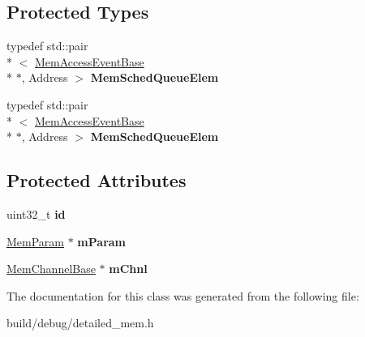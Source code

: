 \subsection*{Protected Types}
\begin{DoxyCompactItemize}
\item 
\hypertarget{classMemSchedulerBase_acafdeb002bbb399b4589ce1b709d9c33}{typedef std\-::pair\\*
$<$ \hyperlink{classMemAccessEventBase}{Mem\-Access\-Event\-Base} \\*
$\ast$, Address $>$ {\bfseries Mem\-Sched\-Queue\-Elem}}\label{classMemSchedulerBase_acafdeb002bbb399b4589ce1b709d9c33}

\item 
\hypertarget{classMemSchedulerBase_acafdeb002bbb399b4589ce1b709d9c33}{typedef std\-::pair\\*
$<$ \hyperlink{classMemAccessEventBase}{Mem\-Access\-Event\-Base} \\*
$\ast$, Address $>$ {\bfseries Mem\-Sched\-Queue\-Elem}}\label{classMemSchedulerBase_acafdeb002bbb399b4589ce1b709d9c33}

\end{DoxyCompactItemize}
\subsection*{Protected Attributes}
\begin{DoxyCompactItemize}
\item 
\hypertarget{classMemSchedulerBase_a820bdc46cceb0d6bb7474cf53dcd1ab2}{uint32\-\_\-t {\bfseries id}}\label{classMemSchedulerBase_a820bdc46cceb0d6bb7474cf53dcd1ab2}

\item 
\hypertarget{classMemSchedulerBase_a41dd5b70ae8b349ec0ba2af756c49ee3}{\hyperlink{classMemParam}{Mem\-Param} $\ast$ {\bfseries m\-Param}}\label{classMemSchedulerBase_a41dd5b70ae8b349ec0ba2af756c49ee3}

\item 
\hypertarget{classMemSchedulerBase_a2994b5517a1b5285f290365cbe0fb231}{\hyperlink{classMemChannelBase}{Mem\-Channel\-Base} $\ast$ {\bfseries m\-Chnl}}\label{classMemSchedulerBase_a2994b5517a1b5285f290365cbe0fb231}

\end{DoxyCompactItemize}


The documentation for this class was generated from the following file\-:\begin{DoxyCompactItemize}
\item 
build/debug/detailed\-\_\-mem.\-h\end{DoxyCompactItemize}
